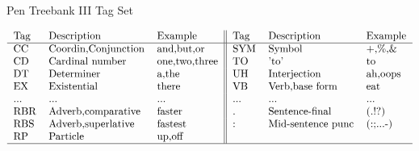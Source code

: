 \begin {table}[h]
\caption {Pen Treebank III Tag Set} \label{tab:tagset} 
\[\begin{tabular}{lll||lll}
  Tag & Description         & Example       & Tag & Description         & Example\\
  \hline                        
  CC  & Coordin,Conjunction & and,but,or    & SYM & Symbol              & +,\%,\&\\
  CD  & Cardinal number     & one,two,three & TO  & 'to'                & to\\
  DT  & Determiner          & a,the         & UH  & Interjection        & ah,oops\\
  EX  & Existential         & there         & VB  & Verb,base form      & eat\\
  ... & ...                 & ...           & ... & ...                 & ...\\
  RBR & Adverb,comparative  & faster        & .   & Sentence-final      & (.!?)\\
  RBS & Adverb,superlative  & fastest       & :   & Mid-sentence punc   & (:;...-)\\
  RP  & Particle            & up,off        &     &                     &\\
  \hline  
\end{tabular}\]
\end{table}

